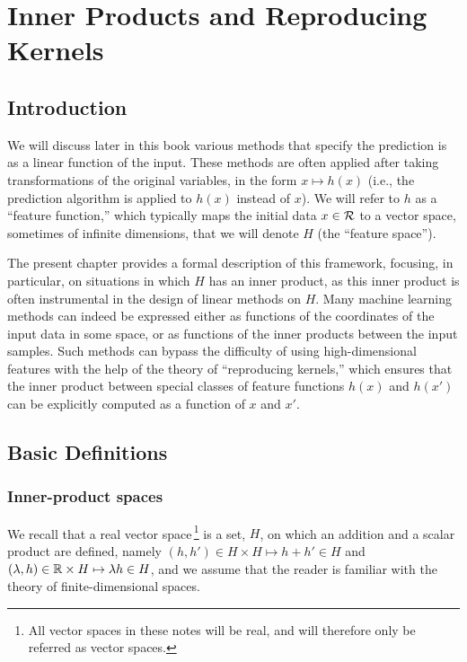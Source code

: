 \chapter{Inner Products and Reproducing Kernels}
\label{chap:higher}

\section{Introduction}
We will discuss later in this book various methods that specify the prediction is  as a linear function of the input. These methods are often applied after taking transformations of the original variables, in the form $x\mapsto h(x)$ (i.e., the prediction algorithm is applied to $h(x)$ instead of $x$). We will refer to $h$ as a ``feature function,'' which typically maps the initial data $x\in {\mathcal R}$ to a vector space, sometimes of infinite dimensions, that we will denote $H$ (the ``feature space''). 

The present chapter provides a formal description of this framework, focusing, in particular, on situations in which $H$ has an inner product, as this inner product is often instrumental in the design of linear methods on $H$. Many machine learning methods can indeed be expressed either as functions of the coordinates of the input data in some space, or as functions of the inner products between the input samples. Such methods can bypass the difficulty of using high-dimensional features with the help of the theory of ``reproducing kernels,'' \citep{aronszajn1950theory,wahba1990spline} which ensures that the inner product between special classes of feature functions $h(x)$ and $h(x')$ can be explicitly computed as a function of $x$ and $x'$. 


\section{Basic Definitions}

\subsection{Inner-product spaces}
We recall that a real vector space\,\footnote{All vector spaces in these notes will be real, and will therefore only be referred as vector spaces.} is a set, $H$, on which an addition and a scalar product are defined, namely $(h,h') \in H\times H \mapsto h+h'\in H$ and $(\lambda, h) \in {\mathbb{R}} \times H \mapsto \lambda h\in H$, and we assume that the reader is familiar with the theory of finite-dimensional spaces. 

